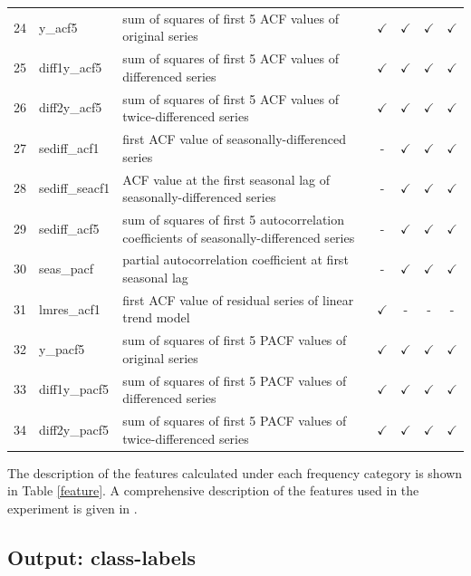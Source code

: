 \documentclass[11pt,a4paper,]{article}
\def\yes{$\checkmark$}
\begin{document}
\begin{table}[!htp]
\begin{tabular}{llp{}cccc}
24 & y\_acf5        & sum of squares of first 5 ACF values of original series                                 & \yes  & \yes & \yes & \yes\\
25 & diff1y\_acf5   & sum of squares of first 5 ACF values of differenced series                              & \yes  & \yes & \yes & \yes\\
26 & diff2y\_acf5   & sum of squares of first 5 ACF values of twice-differenced series                        & \yes  & \yes & \yes & \yes \\
27 & sediff\_acf1   & first ACF value of seasonally-differenced series                                        & -     & \yes & \yes & \yes\\
28 & sediff\_seacf1 & ACF value at the first seasonal lag of seasonally-differenced series                    & -     & \yes & \yes & \yes\\
29 & sediff\_acf5   & sum of squares of first 5 autocorrelation coefficients of seasonally-differenced series & -     & \yes & \yes & \yes\\
30 & seas\_pacf     & partial autocorrelation coefficient at first seasonal lag & -     & \yes & \yes & \yes\\
31 & lmres\_acf1    & first ACF value of residual series of linear trend model                                & \yes  & - & - & -\\
32 & y\_pacf5       & sum of squares of first 5 PACF values of original series                                & \yes  & \yes & \yes & \yes\\
33 & diff1y\_pacf5  & sum of squares of first 5 PACF values of differenced series                             & \yes  & \yes & \yes & \yes\\
34 & diff2y\_pacf5  & sum of squares of first 5 PACF values of twice-differenced series                       & \yes  & \yes & \yes & \yes\\
\bottomrule
\end{tabular}
\end{table}

The description of the features calculated under each frequency category is shown in Table \ref{feature}. A comprehensive description of the features used in the experiment is given in \textcite{fforms}.

\hypertarget{output-class-labels}{%
\subsection{Output: class-labels}\label{output-class-labels}}
\end{document}
